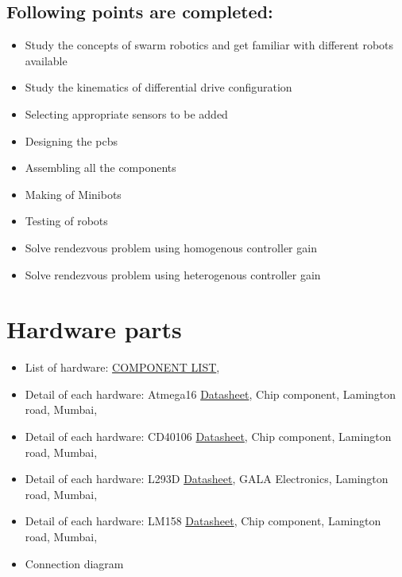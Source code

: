 \documentclass[a4paper,12pt,oneside]{book}
\begin{document}
\subsection*{Following points are completed:}
\begin{itemize}
\item Study the concepts of swarm robotics and get familiar
with different robots available \\
\item Study the kinematics of differential drive configuration \\
\item Selecting appropriate sensors to be added \\
\item Designing the pcbs \\
\item Assembling all the components \\
\item Making of Minibots \\
\item Testing of robots \\
\item Solve rendezvous problem using homogenous controller
gain \\
\item Solve rendezvous problem using heterogenous controller
gain \\
\end{itemize}

\section{Hardware parts}
\begin{itemize}
  \item List of hardware: \href{./COMPONENT LIST}{COMPONENT LIST},
  \item Detail of each hardware: Atmega16 \href{./datasheet/atmega16.pdf}{Datasheet}, {Chip component, Lamington road, Mumbai}, 
  \item Detail of each hardware: CD40106 \href{./datasheet/CD40106.pdf}{Datasheet}, {Chip component, Lamington road, Mumbai}, 
  \item Detail of each hardware: L293D \href{./datasheet/L293.pdf}{Datasheet}, {GALA Electronics, Lamington road, Mumbai}, 
  \item Detail of each hardware: LM158 \href{./datasheet/lm158-n.pdf}{Datasheet}, {Chip component, Lamington road, Mumbai}, 
  \item Connection diagram
\end{itemize}
\end{document}
